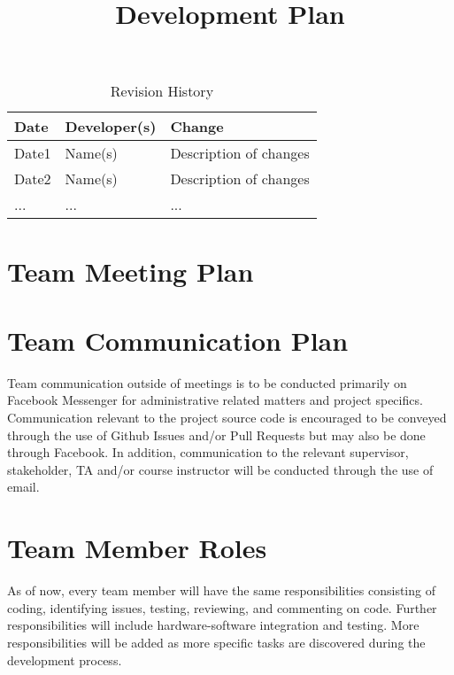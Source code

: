 \documentclass{article}
\title{Development Plan\\\progname}
\author{\authname}
\date{}
\begin{document}
\begin{table}[H]
\caption{Revision History} \label{TblRevisionHistory}
\begin{tabularx}{\textwidth}{llX}
\toprule
\textbf{Date} & \textbf{Developer(s)} & \textbf{Change}\\
\midrule
Date1 & Name(s) & Description of changes\\
Date2 & Name(s) & Description of changes\\
... & ... & ...\\
\bottomrule
\end{tabularx}
\end{table}

\newpage

\maketitle


\section{Team Meeting Plan}

\section{Team Communication Plan}

Team communication outside of meetings is to be conducted primarily on Facebook Messenger
for administrative related matters and project specifics. Communication relevant to the project
source code is encouraged to be conveyed through the use of Github Issues and/or Pull Requests
but may also be done through Facebook. In addition, communication to the relevant supervisor,
stakeholder, TA and\slash or course instructor will be conducted through the use of email.

\section{Team Member Roles}

As of now, every team member will have the same responsibilities consisting of coding,
identifying issues, testing, reviewing, and commenting on code. Further responsibilities
will include hardware-software integration and testing. More responsibilities will be
added as more specific tasks are discovered during the development process.
\end{document}
